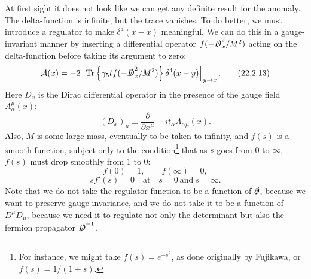 At first sight it does not look like we can get any definite result for the
anomaly. The delta-function is infinite, but the trace vanishes. To do
better, we must introduce a regulator to make $\delta^4(x-x)$ meaningful.
We can do this in a gauge-invariant manner by inserting a differential
operator $f(-\sl{D}_x^2/M^2)$ acting on the delta-function before taking
its argument to zero:
\begin{equation}
 \mathcal A(x)=-2\left[
  \operatorname{Tr}\left\{\gamma_5t
  f(-\sl{D}_x^2/M^2)\right\}\delta^4(x-y)
 \right]_{y\to x}.
 \tag{22.2.13}\label{eq:22.2.13}
\end{equation}
Here $D_x$ is the Dirac differential operator in the presence of the gauge
field $A_\alpha^\mu(x)$:
\begin{equation}
 (D_x)_\mu\equiv\frac{\partial}{\partial x^\mu}
 -it_\alpha A_{\alpha\mu}(x).
 \tag{22.2.14}\label{eq:22.2.14}
\end{equation}
Also, $M$ is some large mass, eventually to be taken to infinity, and
$f(s)$ is a smooth function, subject only to the condition\footnote{For
instance, we might take $f(s)=e^{-s^2}$, as done originally by Fujikawa,
or $f(s)=1/(1+s)$.} that as $s$ goes from 0 to $\infty$, $f(s)$ must drop
smoothly from 1 to 0:
\begin{equation}
 f(0)=1,\qquad f(\infty)=0,
 \tag{22.2.15}\label{eq:22.2.15}
\end{equation}
\begin{equation}
 sf'(s)=0\quad\text{at}\quad s=0\ \text{and}\ s=\infty.
 \tag{22.2.16}\label{eq:22.2.16}
\end{equation}
Note that we do not take the regulator function to be a function of
$\sl{\partial}$, because we want to preserve gauge invariance, and we do
not take it to be a function of $D^\mu D_\mu$, because we need it to
regulate not only the determinant but also the fermion propagator
$\sl{D}^{-1}$.

